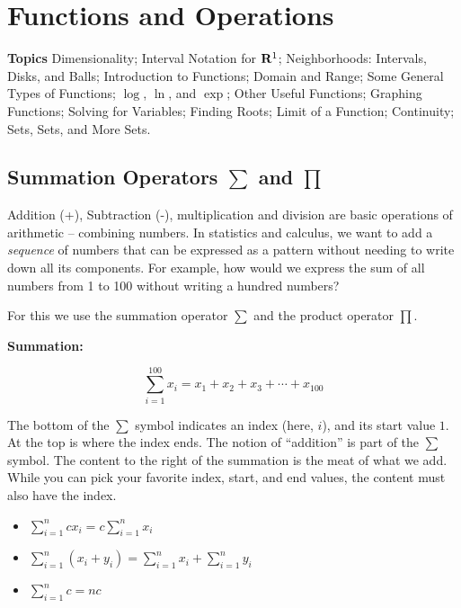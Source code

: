 \documentclass[]{book}
\providecommand{\tightlist}{%
  \setlength{\itemsep}{0pt}\setlength{\parskip}{0pt}}
\theoremstyle{definition}
\theoremstyle{definition}
\theoremstyle{definition}
\theoremstyle{remark}
\begin{document}
\chapter{Functions and Operations}\label{functions-and-operations}

\textbf{Topics} Dimensionality; Interval Notation for \({\bf R}^1\);
Neighborhoods: Intervals, Disks, and Balls; Introduction to Functions;
Domain and Range; Some General Types of Functions; \(\log\), \(\ln\),
and \(\exp\); Other Useful Functions; Graphing Functions; Solving for
Variables; Finding Roots; Limit of a Function; Continuity; Sets, Sets,
and More Sets.

\section{\texorpdfstring{Summation Operators \(\sum\) and
\(\prod\)}{Summation Operators \textbackslash{}sum and \textbackslash{}prod}}\label{sum-notation}

Addition (+), Subtraction (-), multiplication and division are basic
operations of arithmetic -- combining numbers. In statistics and
calculus, we want to add a \emph{sequence} of numbers that can be
expressed as a pattern without needing to write down all its components.
For example, how would we express the sum of all numbers from 1 to 100
without writing a hundred numbers?

For this we use the summation operator \(\sum\) and the product operator
\(\prod\).

\textbf{Summation:}

\[\sum\limits_{i=1}^{100} x_i = x_1+x_2+x_3+\cdots+x_{100}\]

The bottom of the \(\sum\) symbol indicates an index (here, \(i\)), and
its start value \(1\). At the top is where the index ends. The notion of
``addition'' is part of the \(\sum\) symbol. The content to the right of
the summation is the meat of what we add. While you can pick your
favorite index, start, and end values, the content must also have the
index.

\begin{itemize}
\tightlist
\item
  \(\sum\limits_{i=1}^n c x_i = c \sum\limits_{i=1}^n x_i \)
\item
  \(\sum\limits_{i=1}^n (x_i + y_i) = \sum\limits_{i=1}^n x_i + \sum\limits_{i=1}^n y_i\)
\item
  \(\sum\limits_{i=1}^n c = n c \)
\end{itemize}
\end{document}
